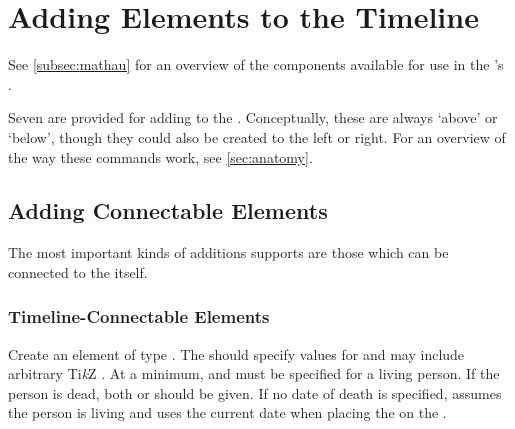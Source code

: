 \documentclass[10pt,british,a4paper]{ltxdoc}
\newcommand*\pkg[1]{\textpkg{#1}}
\newcommand*\TikZ{Ti\emph{k}Z}
\begin{document}



\section{Adding Elements to the Timeline}\label{sec:macros-add-elements}

See \cref{subsec:mathau} for an overview of the components available for use in the 's .

Seven \macroslabelname{} are provided for adding \elementslabelname{} to the .
Conceptually, these are always ‘above’ or ‘below’, though they could also be created to the left or right.
For an overview of the way these commands work, see \cref{sec:anatomy}. 

\subsection{Adding Connectable Elements}\label{subsec:macros-connected-elements}

The most important kinds of additions \pkg{chronos} supports are those which can be connected to the  itself.

\subsubsection{Timeline-Connectable Elements}\label{subsubsec:macros-timeline-connectable}

\DescribeMacro{\chronoslife} \AfterLastParam %
Create an element of type .
The  should specify values for \pkg{chronos} \keyslabelname{} and may include arbitrary \TikZ{} \keyslabelname{}.
At a minimum,  and  must be specified for a living person.
If the person is dead, both  or  should be given.
If no date of death is specified, \pkg{chronos} assumes the person is living and uses the current date when placing the \elementlabelname{} on the .
\end{document}
